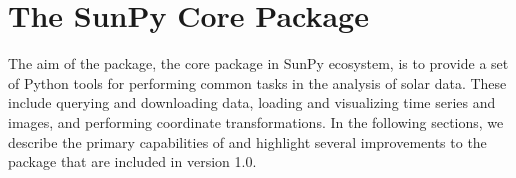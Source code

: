 \section{The SunPy Core Package}
\label{sec:sunpycore}

The aim of the \sunpypkg package, the core package in SunPy ecosystem, is to provide a set of Python tools for performing common tasks in the analysis of solar data.
These include querying and downloading data, loading and visualizing time series and images, and performing coordinate transformations.
In the following sections, we describe the primary capabilities of \sunpypkg and highlight several improvements to the package that are included in version 1.0.
